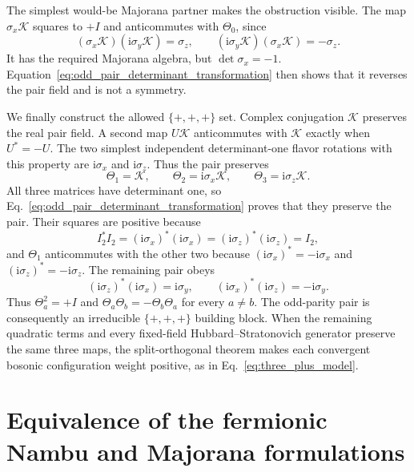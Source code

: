 \documentclass[onecolumn,aps,prb,amsmath,amssymb,superscriptaddress,longbibliography]{revtex4-2}
\newcommand{\ii}{\mathrm{i}}
\newcommand{\mc}[1]{\mathcal{#1}}
\begin{document}
The simplest would-be Majorana partner makes the obstruction visible.  The map \(\sigma_x\mc K\) squares to \(+I\) and anticommutes with \(\Theta_0\), since
\begin{equation}
    (\sigma_x\mc K)(\ii\sigma_y\mc K)=\sigma_z,
    \qquad
    (\ii\sigma_y\mc K)(\sigma_x\mc K)=-\sigma_z.
    \label{eq:failed_majorana_partner}
\end{equation}
It has the required Majorana algebra, but \(\det\sigma_x=-1\).  Equation~\eqref{eq:odd_pair_determinant_transformation} then shows that it reverses the pair field and is not a symmetry.

We finally construct the allowed \(\{+,+,+\}\) set.  Complex conjugation \(\mc K\) preserves the real pair field.  A second map \(U\mc K\) anticommutes with \(\mc K\) exactly when \(U^*=-U\).  The two simplest independent determinant-one flavor rotations with this property are \(\ii\sigma_x\) and \(\ii\sigma_z\).  Thus the pair preserves
\begin{equation}
    \Theta_1=\mc K,
    \qquad
    \Theta_2=\ii\sigma_x\mc K,
    \qquad
    \Theta_3=\ii\sigma_z\mc K.
    \label{eq:odd_pair_three_plus_TR}
\end{equation}
All three matrices have determinant one, so Eq.~\eqref{eq:odd_pair_determinant_transformation} proves that they preserve the pair.  Their squares are positive because
\begin{equation}
    I_2^*I_2=(\ii\sigma_x)^*(\ii\sigma_x)
    =(\ii\sigma_z)^*(\ii\sigma_z)=I_2,
    \label{eq:three_plus_positive_squares}
\end{equation}
and \(\Theta_1\) anticommutes with the other two because \((\ii\sigma_x)^*=-\ii\sigma_x\) and \((\ii\sigma_z)^*=-\ii\sigma_z\).  The remaining pair obeys
\begin{equation}
    (\ii\sigma_z)^*(\ii\sigma_x)=\ii\sigma_y,
    \qquad
    (\ii\sigma_x)^*(\ii\sigma_z)=-\ii\sigma_y.
    \label{eq:three_plus_last_anticommutator}
\end{equation}
Thus \(\Theta_a^2=+I\) and \(\Theta_a\Theta_b=-\Theta_b\Theta_a\) for every \(a\ne b\).  The odd-parity pair is consequently an irreducible \(\{+,+,+\}\) building block.  When the remaining quadratic terms and every fixed-field Hubbard--Stratonovich generator preserve the same three maps, the split-orthogonal theorem makes each convergent bosonic configuration weight positive, as in Eq.~\eqref{eq:three_plus_model}.

\section{Equivalence of the fermionic Nambu and Majorana formulations}
\end{document}
